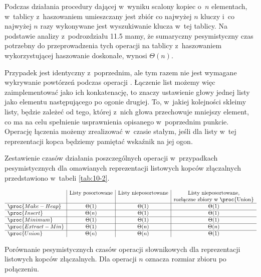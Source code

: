 Podczas działania procedury  dającej w~wyniku scalony kopiec o~$n$ elementach, w~tablicy z~haszowaniem umieszczany jest zbiór co najwyżej $n$ kluczy i~co najwyżej $n$ razy wykonywane jest wyszukiwanie klucza w~tej tablicy.
Na podstawie analizy z~podrozdziału 11.5 mamy, że sumaryczny pesymistyczny czas potrzebny do przeprowadzenia tych operacji na tablicy z~haszowaniem wykorzystującej haszowanie doskonałe, wynosi $\Theta(n)$.

\subproblem %
Przypadek jest identyczny z~poprzednim, ale tym razem nie jest wymagane wykrywanie powtórzeń podczas operacji .
Łączenie list możemy więc zaimplementować jako ich konkatenację, to znaczy ustawienie głowy jednej listy jako elementu następującego po ogonie drugiej.
To, w~jakiej kolejności skleimy listy, będzie zależeć od tego, której z~nich głowa przechowuje mniejszy element, co ma na celu spełnienie usprawnienia opisanego w~poprzednim punkcie.
Operację łączenia możemy zrealizować w~czasie stałym, jeśli dla listy w~tej reprezentacji kopca będziemy pamiętać wskaźnik na jej ogon.

\bigskip
\noindent Zestawienie czasów działania poszczególnych operacji w~przypadkach pesymistycznych dla omawianych reprezentacji listowych kopców złączalnych przedstawiono w~tabeli \ref{tab:10-2}.

\begin{table}[!ht]
	\centering
		\[
			\begin{array}{l|c|c|c}
				& \text{Listy posortowane} & \text{Listy nieposortowane} & \text{Listy nieposortowane,} \\
				&  &  & \text{rozłączne zbiory w~\proc{Union}} \\
				\hline
				\proc{Make-Heap} & \Theta(1) & \Theta(1) & \Theta(1) \\
				\hline
				\proc{Insert} & \Theta(n) & \Theta(1) & \Theta(1) \\
				\hline
				\proc{Minimum} & \Theta(1) & \Theta(1) & \Theta(1) \\
				\hline
				\proc{Extract-Min} & \Theta(1) & \Theta(n) & \Theta(n) \\
				\hline
				\proc{Union} & \Theta(n) & \Theta(n) & \Theta(1)
			\end{array}
		\]
	\caption{Porównanie pesymistycznych czasów operacji słownikowych dla reprezentacji listowych kopców złączalnych.
Dla operacji  $n$ oznacza rozmiar zbioru po połączeniu.} \label{tab:10-2}
\end{table}
